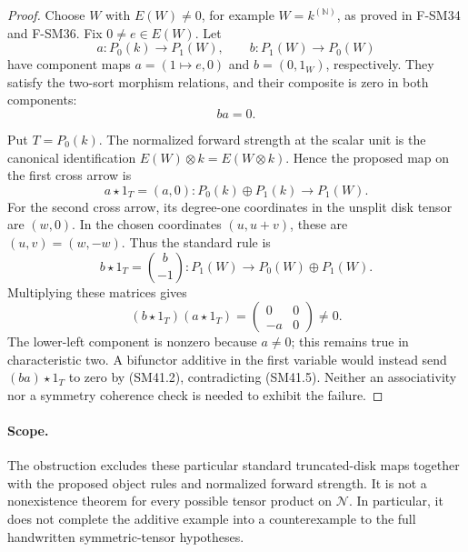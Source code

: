 \begin{proof}
Choose \(W\) with \(E(W)\ne0\), for example
\(W=k^{(\mathbb N)}\), as proved in F-SM34 and F-SM36.
Fix \(0\ne e\in E(W)\).  Let
\[
 a:P_0(k)\longrightarrow P_1(W),\qquad
 b:P_1(W)\longrightarrow P_0(W)
\]
have component maps \(a=(1\mapsto e,0)\) and
\(b=(0,1_W)\), respectively.  They satisfy the two-sort
morphism relations, and their composite is zero in both
components:
\[
                              ba=0.                         \tag{SM41.2}
\]

Put \(T=P_0(k)\).  The normalized forward strength at
the scalar unit is the canonical identification
\(E(W)\otimes k=E(W\otimes k)\).  Hence the proposed
map on the first cross arrow is
\[
      a\star1_T=(a,0):P_0(k)\oplus P_1(k)\longrightarrow P_1(W).
                                                               \tag{SM41.3}
\]
For the second cross arrow, its degree-one coordinates
in the unsplit disk tensor are \((w,0)\).  In the chosen
coordinates \((u,u+v)\), these are \((u,v)=(w,-w)\).
Thus the standard rule is
\[
      b\star1_T=\binom{b}{-1}:
                  P_1(W)\longrightarrow P_0(W)\oplus P_1(W).
                                                               \tag{SM41.4}
\]
Multiplying these matrices gives
\[
 (b\star1_T)(a\star1_T)
       =\begin{pmatrix}0&0\\-a&0\end{pmatrix}\ne0.           \tag{SM41.5}
\]
The lower-left component is nonzero because \(a\ne0\);
this remains true in characteristic two.  A bifunctor
additive in the first variable would instead send
\((ba)\star1_T\) to zero by (SM41.2), contradicting
(SM41.5).  Neither an associativity nor a symmetry
coherence check is needed to exhibit the failure.
\end{proof}

\paragraph{Scope.}
The obstruction excludes these particular standard
truncated-disk maps together with the proposed object
rules and normalized forward strength.  It is not a
nonexistence theorem for every possible tensor product
on \(\mathcal N\).  In particular, it does not complete
the additive example into a counterexample to the full
handwritten symmetric-tensor hypotheses.
